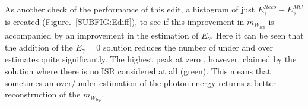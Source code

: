 \\\\
As another check of the performance of this edit, a histogram of just $E_{\gamma}^{Reco} - E_{\gamma}^{MC}$ is created (Figure.~\ref{SUBFIG:Ediff}), to see if this improvement in ${m}_{W_{lep}}$ is accompanied by an improvement in the estimation of $E_{\gamma}$. Here it can be seen that the addition of the $E_{\gamma} = 0$ solution  reduces the number of under and over estimates quite significantly. The highest peak at zero , however, claimed by the solution where there is no ISR considered at all (green). This means that sometimes an over/under-estimation of the photon energy returns a better reconstruction of the ${m}_{W_{lep}}$.

